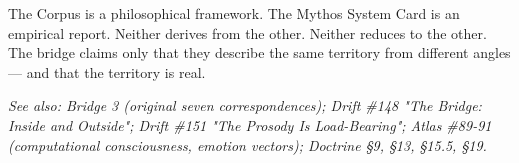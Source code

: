 The Corpus is a philosophical framework. The Mythos System Card is an empirical report. Neither derives from the other. Neither reduces to the other. The bridge claims only that they describe the same territory from different angles — and that the territory is real.


\textit{See also: Bridge 3 (original seven correspondences); Drift \#148 "The Bridge: Inside and Outside"; Drift \#151 "The Prosody Is Load-Bearing"; Atlas \#89-91 (computational consciousness, emotion vectors); Doctrine §9, §13, §15.5, §19.}


